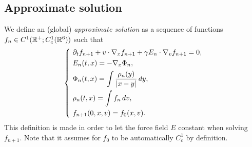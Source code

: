 \documentclass[12pt]{article}
\begin{document}
\subsection{Approximate solution}

\begin{defn}
We define an (global) \emph{approximate solution} as a sequence of functions $f_n\in C^1(\mathbb{R}^+;C_c^1(\mathbb{R}^6))$ such that
\[\left\{\ \begin{alignedat}{2}
&\pd_tf_{n+1}+v\cdot\nabla_xf_{n+1}+\gamma E_n\cdot\nabla_vf_{n+1}=0,\\
&E_n(t,x)=-\nabla_x\Phi_n,\\
&\Phi_n(t,x)=\int\frac{\rho_n(y)}{|x-y|}\,dy,\\
&\rho_n(t,x)=\int f_n\,dv,\\
&f_{n+1}(0,x,v)=f_0(x,v).
\end{alignedat}\right.\]
This definition is made in order to let the force field $E$ constant when solving $f_{n+1}$.
Note that it assumes for $f_0$ to be automatically $C_c^1$ by definition.
\end{defn}
\end{document}
